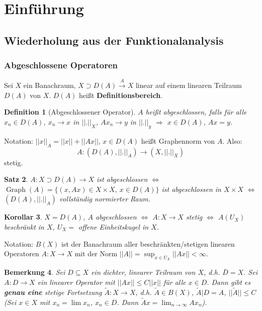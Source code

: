 \documentclass[12pt,a4paper,titlepage]{scrartcl}
\newtheorem{Satz}{Satz}[subsection]
\newtheorem{Definition}[Satz]{Definition}
\newtheorem{Bemerkung}[Satz]{Bemerkung}
\newtheorem{Korollar}[Satz]{Korollar}
\DeclareMathOperator{\Graph}{Graph}
\numberwithin{equation}{section}
\begin{document}
	\newpage	
	\tableofcontents
	\newpage	
	
	\newpage
	\section{Einführung}
	
	\subsection{Wiederholung aus der Funktionalanalysis}
	
	\subsubsection{Abgeschlossene Operatoren}
	
	Sei $X$ ein Banachraum, $X\supset D(A)\overset{A}{\rightarrow} X$ linear auf einem linearen Teilraum $D(A)$ von $X$. $D(A)$ heißt \textbf{Definitionsbereich}. 
	
	\begin{Definition}[Abgeschlossener Operator]
		$A$ heißt abgeschlossen, falls für alle $x_n\in D(A)$, $x_n\rightarrow x$ in $||.||_X$, $Ax_n\rightarrow y$ in $||.||_y$ $\Rightarrow$ $x\in D(A)$, $Ax= y$.
	\end{Definition}
	
	Notation: $||x||_A = ||x||+||Ax||$, $x\in D(A)$ heißt Graphennorm von $A$. Also: 
	$$A:(D(A),||.||_A)\rightarrow (X,||.||_X)$$
	stetig.
	
	\begin{Satz}
		$A:X\supset D(A)\rightarrow X$ ist abgeschlossen $\Leftrightarrow$ $\Graph(A) = \{(x,Ax)\in X\times X,~ x\in D(A) \}$ ist abgeschlossen in $X\times X$ $\Leftrightarrow$ $(D(A),||.||_A)$ vollständig normierter Raum.
	\end{Satz}
	
	\begin{Korollar}
		$X = D(A)$, $A$ abgeschlossen $\Leftrightarrow$ $A:X\rightarrow X$ stetig $\Leftrightarrow$ $A(U_X)$ beschränkt in $X$, $U_X = $ offene Einheitskugel in $X$.
	\end{Korollar}
	
	Notation: $B(X)$ ist der Banachraum aller beschränkten/stetigen linearen Operatoren $A:X\rightarrow X$ mit der Norm $||A|| = \sup_{x\in U_X}||Ax|| <\infty$.
	
	\begin{Bemerkung}
		Sei $D\subseteq X$ ein dichter, linearer Teilraum von $X$, d.h. $\bar{D} = X$. Sei $A:D\rightarrow X$ ein linearer Operator mit $||Ax||\leq C||x||$ für alle $x\in D$. Dann gibt es \textbf{genau eine} stetige Fortsetzung $\tilde{A}: X\rightarrow X$, d.h. $\tilde{A}\in B(X)$, $\tilde{A}|D = A$, $||\tilde{A}||\leq C$ (Sei $x\in X$ mit $x_n=\lim x_n$, $x_n\in D$. Dann $\tilde{A}x=\lim_{n\rightarrow\infty} Ax_n$).
	\end{Bemerkung}
	
\end{document}
